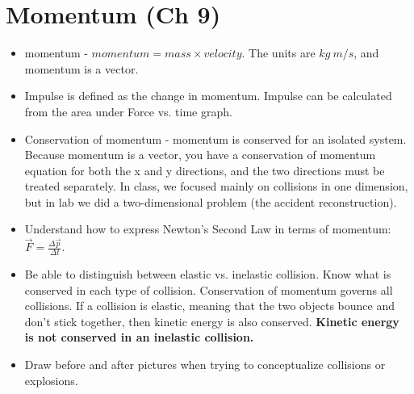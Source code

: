 \section{Momentum (Ch 9)}
\vspace*{-.15in}
\begin{itemize}
\item momentum - $momentum = mass \times velocity$.  The units are $kg
  \ m/s$, and momentum is a vector.  
\item Impulse is defined as the change in momentum.  Impulse can be
  calculated from the area under Force vs. time graph.
\item Conservation of momentum - momentum is conserved for an isolated
  system.  Because momentum is a vector, you have a conservation of
  momentum equation for both the x and y directions, and the two
  directions must be treated separately.  In class, we focused mainly on collisions in one
  dimension, but in lab we did a two-dimensional problem (the accident reconstruction).
\item Understand how to express Newton's Second Law in terms of
  momentum: $\vec{F} = \frac{\Delta \vec{p}}{\Delta t}$.
\item Be able to distinguish between elastic vs. inelastic collision.
  Know what is conserved in each type of collision.
Conservation of momentum governs all collisions.  If a collision is elastic, 
meaning that the two objects bounce and don't stick together, then 
kinetic energy is also conserved.  {\bf Kinetic energy is not conserved in an inelastic 
collision.}
\item Draw before and after pictures when trying to conceptualize
  collisions or explosions.
\end{itemize}

\vspace*{-.15in}
